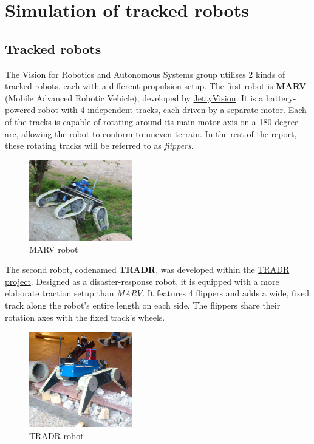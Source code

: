 \documentclass[a4paper,12pt]{article}
\begin{document}
\clearpage


\section{Simulation of tracked robots}
\label{sec:robots_props}

\subsection{Tracked robots}
\label{sec:robots}

The Vision for Robotics and Autonomous Systems group utilises 2 kinds of tracked robots, each with a different propulsion setup. The first robot is \textbf{MARV} (Mobile Advanced Robotic Vehicle), developed by \href{https://jettyvision.cz/servisni-robot-marv/}{JettyVision}. It is a battery-powered robot with 4 independent tracks, each driven by a separate motor. Each of the tracks is capable of rotating around its main motor axis on a 180-degree arc, allowing the robot to conform to uneven terrain. In the rest of the report, these rotating tracks will be referred to as \textit{flippers}.

\begin{figure}[!h]
  \centering
  \includegraphics[width=0.4\textwidth]{fig/marv.jpg}
  \caption{MARV robot}
  \label{fig:marv}
\end{figure}

The second robot, codenamed \textbf{TRADR}, was developed within the \href{https://www.tradr-project.eu/}{TRADR project}. Designed as a disaster-response robot, it is equipped with a more elaborate traction setup than \textit{MARV}. It features 4 flippers and adds a wide, fixed track along the robot's entire length on each side. The flippers share their rotation axes with the fixed track's wheels. 

\begin{figure}[!h]
  \centering
  \includegraphics[width=0.4\textwidth]{fig/tradr.jpg}
  \caption{TRADR robot}
  \label{fig:tradr}
\end{figure}
\end{document}
